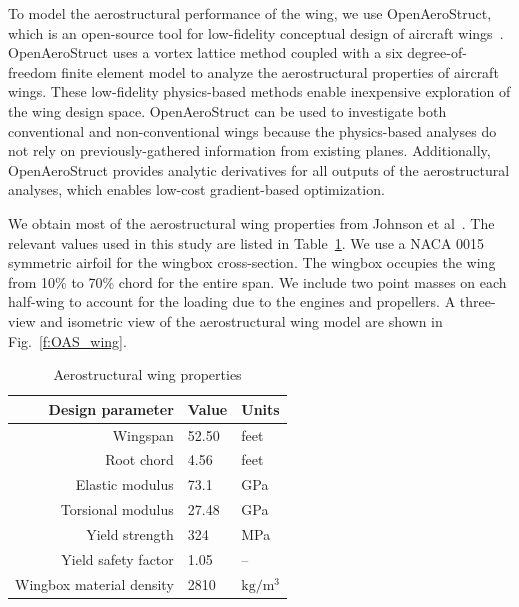 
To model the aerostructural performance of the wing, we use OpenAeroStruct, which is an open-source tool for low-fidelity conceptual design of aircraft wings~\cite{Jasa2018a}.
OpenAeroStruct uses a vortex lattice method coupled with a six degree-of-freedom finite element model to analyze the aerostructural properties of aircraft wings.
These low-fidelity physics-based methods enable inexpensive exploration of the wing design space.
OpenAeroStruct can be used to investigate both conventional and non-conventional wings because the physics-based analyses do not rely on previously-gathered information from existing planes.
Additionally, OpenAeroStruct provides analytic derivatives for all outputs of the aerostructural analyses, which enables low-cost gradient-based optimization.

We obtain most of the aerostructural wing properties from Johnson et al~\cite{johnson2018concept}.
The relevant values used in this study are listed in Table~\ref{t:aerostruct_wing}.
We use a NACA 0015 symmetric airfoil for the wingbox cross-section.
The wingbox occupies the wing from 10\% to 70\% chord for the entire span.
We include two point masses on each half-wing to account for the loading due to the engines and propellers.
A three-view and isometric view of the aerostructural wing model are shown in Fig.~\ref{f:OAS_wing}.

\begin{table}[!htb]
 \normalsize
 \begin{center}
  \caption{Aerostructural wing properties}
  \label{t:aerostruct_wing}
    \begin{tabular}{ r l l }
        \hline
        \textbf{Design parameter} & \textbf{Value} & \textbf{Units} \\
        \hline
        Wingspan & 52.50 & feet \\
        Root chord & 4.56 & feet \\
        Elastic modulus & 73.1 & GPa \\
        Torsional modulus & 27.48 & GPa \\
        Yield strength & 324 & MPa \\
        Yield safety factor & 1.05 & -- \\
        Wingbox material density & 2810 & $\text{kg}/\text{m}^3$ \\
        \hline
    \end{tabular}
 \end{center}
\end{table}

